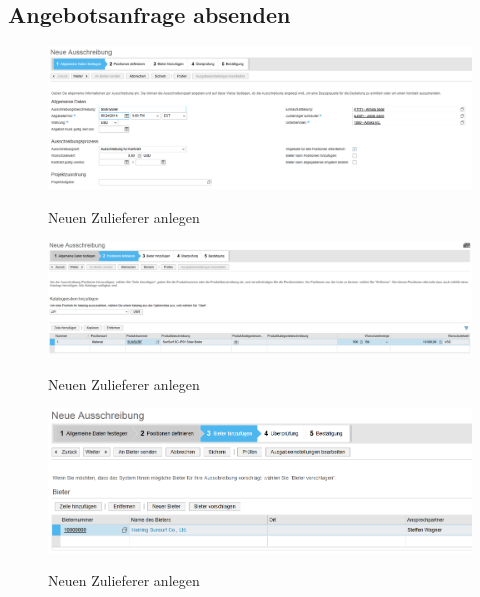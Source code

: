 \subsection{Angebotsanfrage absenden}
\label{sendrfq}

\begin{figure}[H]
	\begin{center}
	\includegraphics[width=1.0\textwidth]{grafiken/ByDesign-HowTo-Ausschreibung-1.png}
	\caption{Neuen Zulieferer anlegen}
	\vspace{-10pt}
	\label{abb:byd-newsupplier}
	\end{center}
\end{figure}
\begin{figure}[H]
	\begin{center}
	\includegraphics[width=1.0\textwidth]{grafiken/ByDesign-HowTo-Ausschreibung-2.png}
	\caption{Neuen Zulieferer anlegen}
	\vspace{-10pt}
	\label{abb:byd-newsupplier}
	\end{center}
\end{figure}
\begin{figure}[H]
	\begin{center}
	\includegraphics[width=1.0\textwidth]{grafiken/ByDesign-HowTo-Ausschreibung-3.png}
	\caption{Neuen Zulieferer anlegen}
	\vspace{-10pt}
	\label{abb:byd-newsupplier}
	\end{center}
\end{figure}
